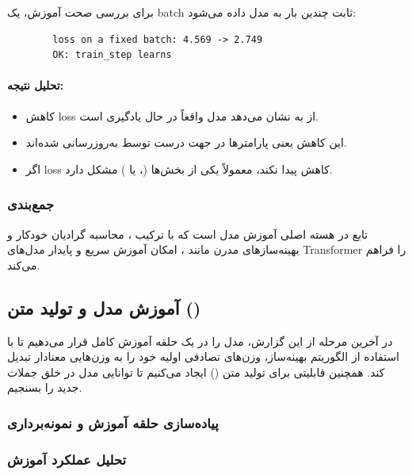 \documentclass{article}
\begin{document}
برای بررسی صحت آموزش، یک batch ثابت چندین بار به مدل داده می‌شود:

\begin{latin}
	\begin{verbatim}
		loss on a fixed batch: 4.569 -> 2.749
		OK: train_step learns
	\end{verbatim}
\end{latin}

\paragraph{تحلیل نتیجه:}

\begin{itemize}
	\item کاهش loss از  به  نشان می‌دهد مدل واقعاً در حال یادگیری است.
	\item این کاهش یعنی پارامترها در جهت درست توسط  به‌روزرسانی شده‌اند.
	\item اگر loss کاهش پیدا نکند، معمولاً یکی از بخش‌ها (،  یا ) مشکل دارد.
\end{itemize}

\subsubsection*{جمع‌بندی}

تابع  در  هسته اصلی آموزش مدل است که با ترکیب ، محاسبه گرادیان خودکار و بهینه‌سازهای مدرن مانند ، امکان آموزش سریع و پایدار مدل‌های Transformer را فراهم می‌کند.

\subsection{آموزش مدل و تولید متن ()}

در آخرین مرحله از این گزارش، مدل  را در یک حلقه آموزش کامل قرار می‌دهیم تا با استفاده از الگوریتم بهینه‌ساز، وزن‌های تصادفی اولیه خود را به وزن‌هایی معنادار تبدیل کند. همچنین قابلیتی برای تولید متن () ایجاد می‌کنیم تا توانایی مدل در خلق جملات جدید را بسنجیم.

\subsubsection*{پیاده‌سازی حلقه آموزش و نمونه‌برداری}


\subsubsection*{تحلیل عملکرد آموزش}
\end{document}
